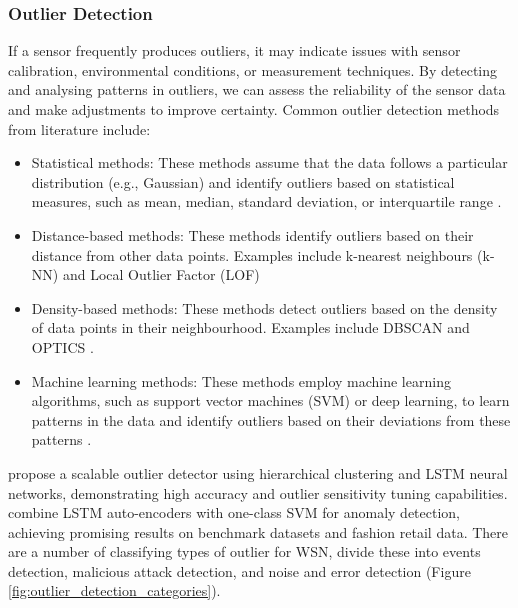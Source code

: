 \subsubsection{Outlier Detection}
If a sensor frequently produces outliers, it may indicate issues with sensor calibration, environmental conditions, or measurement techniques. By detecting and analysing patterns in outliers, we can assess the reliability of the sensor data and make adjustments to improve certainty. Common outlier detection methods from literature include:

\begin{itemize}
    \item Statistical methods: These methods assume that the data follows a particular distribution (e.g., Gaussian) and identify outliers based on statistical measures, such as mean, median, standard deviation, or interquartile range \citep{iglewiczVolume16How1993,aggarwalOutlierEnsembles2017}.
    \item Distance-based methods: These methods identify outliers based on their distance from other data points. Examples include k-nearest neighbours (k-NN) and Local Outlier Factor (LOF) \citep{ramaswamyEfficientAlgorithmsMining2000,breunigLOFIdentifyingDensitybased2000}
    \item Density-based methods: These methods detect outliers based on the density of data points in their neighbourhood. Examples include DBSCAN and OPTICS \citep{esterDensityBasedAlgorithmDiscovering1996, ankerstOPTICSOrderingPoints1999}.
    \item Machine learning methods: These methods employ machine learning algorithms, such as support vector machines (SVM) or deep learning, to learn patterns in the data and identify outliers based on their deviations from these patterns \citep{blazquez-garciaReviewOutlierAnomaly2021}.
\end{itemize}

\cite{shuklaScalableRobustOutlier2020} propose a scalable outlier detector using hierarchical clustering and LSTM neural networks, demonstrating high accuracy and outlier sensitivity tuning capabilities. \cite{nguyenForecastingAnomalyDetection2021} combine LSTM auto-encoders with one-class SVM for anomaly detection, achieving promising results on benchmark datasets and fashion retail data. There are a number of classifying types of outlier for WSN, \cite{zhangOutlierDetectionTechniques2010} divide these into events detection, malicious attack detection, and noise and error detection (Figure \ref{fig:outlier_detection_categories}).

